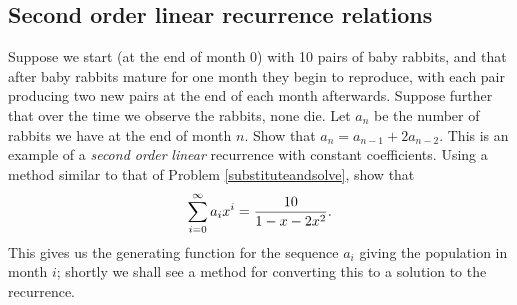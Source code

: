 \subsection{Second order linear recurrence relations}
\bp
\iteme Suppose we start (at the end of month 0) with 10 pairs of baby rabbits,
and that after baby rabbits mature for one month they begin to reproduce, with
each pair producing two new pairs at the end of each month afterwards.  Suppose
further that over the time we observe the rabbits, none die. Let $a_n$ be the
number of rabbits we have at the end of month $n$. Show that
$a_n=a_{n-1} + 2a_{n-2}$.  This is an example of a {\em second
order}
{\em linear} recurrence with constant coefficients.  Using a method similar to that  of Problem
\ref{substituteandsolve}, show that 
 $$\sum_{i=0}^\infty a_ix^i = {10\over 1-x-2x^2}.$$
This gives us the generating function for the sequence $a_i$ giving the
population in month $i$; shortly we shall see a method for converting
this to a solution to the recurrence. \label{secondorderintroduction}

